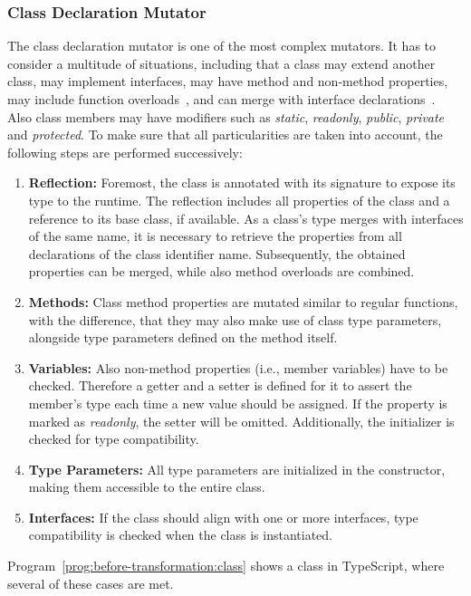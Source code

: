 \subsubsection{Class Declaration Mutator}

The class declaration mutator is one of the most complex mutators. It has to consider a multitude of situations, including that a class may extend another class, may implement interfaces, may have method and non-method properties, may include function overloads~\cite{TypeScriptHandbook:Functions}, and can merge with interface declarations~\cite{TypeScriptHandbook:DeclarationMerging}. Also class members may have modifiers such as \emph{static}, \emph{readonly}, \emph{public}, \emph{private} and \emph{protected}. To make sure that all particularities are taken into account, the following steps are performed successively:
\begin{enumerate}
  \item \textbf{Reflection:} Foremost, the class is annotated with its signature to expose its type to the runtime. The reflection includes all properties of the class and a reference to its base class, if available. As a class's type merges with interfaces of the same name, it is necessary to retrieve the properties from all declarations of the class identifier name. Subsequently, the obtained properties can be merged, while also method overloads are combined.
  \item \textbf{Methods:} Class method properties are mutated similar to regular functions, with the difference, that they may also make use of class type parameters, alongside type parameters defined on the method itself.
  \item \textbf{Variables:} Also non-method properties (i.e., member variables) have to be checked. Therefore a getter and a setter is defined for it to assert the member's type each time a new value should be assigned. If the property is marked as \emph{readonly}, the setter will be omitted. Additionally, the initializer is checked for type compatibility.
  \item \textbf{Type Parameters:} All type parameters are initialized in the constructor, making them accessible to the entire class.
  \item \textbf{Interfaces:} If the class should align with one or more interfaces, type compatibility is checked when the class is instantiated.
\end{enumerate}
Program~\ref{prog:before-transformation:class} shows a class in TypeScript, where several of these cases are met.
